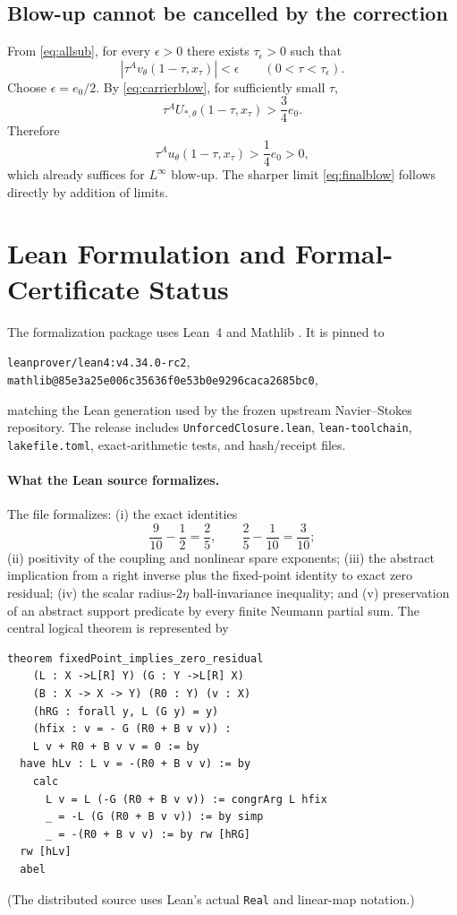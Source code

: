 \documentclass[11pt]{article}
\numberwithin{equation}{section}
\begin{document}
\subsection{Blow-up cannot be cancelled by the correction}
From \eqref{eq:allsub}, for every \(\epsilon>0\) there exists \(\tau_\epsilon>0\) such that
\begin{equation}
\left|\tau^A v_\theta(1-\tau,x_\tau)\right|<\epsilon
\qquad(0<\tau<\tau_\epsilon).
\label{eq:epssub}
\end{equation}
Choose \(\epsilon=e_0/2\).  By \eqref{eq:carrierblow}, for sufficiently small \(\tau\),
\begin{equation}
\tau^A U_{*,\theta}(1-\tau,x_\tau)>\frac34e_0.
\label{eq:carrierlower}
\end{equation}
Therefore
\begin{equation}
\tau^A u_\theta(1-\tau,x_\tau)>\frac14e_0>0,
\label{eq:finallower}
\end{equation}
which already suffices for \(L^\infty\) blow-up.  The sharper limit \eqref{eq:finalblow} follows directly by addition of limits.

\section{Lean Formulation and Formal-Certificate Status}\label{app:lean}

The formalization package uses Lean~4 and Mathlib \cite{deMouraUllrich2021,Mathlib2020}.  It is pinned to
\begin{center}
\texttt{leanprover/lean4:v4.34.0-rc2},\qquad
\texttt{mathlib@85e3a25e006c35636f0e53b0e9296caca2685bc0},
\end{center}
matching the Lean generation used by the frozen upstream Navier--Stokes repository.  The release includes \texttt{UnforcedClosure.lean}, \texttt{lean-toolchain}, \texttt{lakefile.toml}, exact-arithmetic tests, and hash/receipt files.

\paragraph{What the Lean source formalizes.}
The file formalizes: (i) the exact identities
\[
\frac9{10}-\frac12=\frac25,
\qquad
\frac25-\frac1{10}=\frac3{10};
\]
(ii) positivity of the coupling and nonlinear spare exponents; (iii) the abstract implication from a right inverse plus the fixed-point identity to exact zero residual; (iv) the scalar radius-$2\eta$ ball-invariance inequality; and (v) preservation of an abstract support predicate by every finite Neumann partial sum.  The central logical theorem is represented by
\begin{lstlisting}[language={}]
theorem fixedPoint_implies_zero_residual
    (L : X ->L[R] Y) (G : Y ->L[R] X)
    (B : X -> X -> Y) (R0 : Y) (v : X)
    (hRG : forall y, L (G y) = y)
    (hfix : v = - G (R0 + B v v)) :
    L v + R0 + B v v = 0 := by
  have hLv : L v = -(R0 + B v v) := by
    calc
      L v = L (-G (R0 + B v v)) := congrArg L hfix
      _ = -L (G (R0 + B v v)) := by simp
      _ = -(R0 + B v v) := by rw [hRG]
  rw [hLv]
  abel
\end{lstlisting}
(The distributed source uses Lean's actual \texttt{Real} and linear-map notation.)
\end{document}
